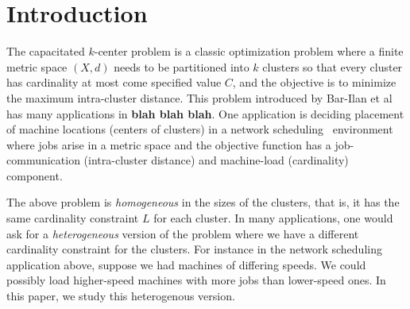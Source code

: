 \section{Introduction}
The capacitated $k$-center problem is a classic optimization problem where a finite metric space $(X,d)$ needs to be partitioned into $k$ clusters so that  every  cluster has cardinality at most
come specified value $C$, and the objective is to minimize the maximum intra-cluster distance. This problem introduced by Bar-Ilan et al~\cite{BKP93} has many applications in {\bf blah blah blah}.
One application is deciding placement of machine locations (centers of clusters) in a network scheduling~\cite{Stein} environment where jobs arise in a metric space and the objective function has a  job-communication (intra-cluster distance) and machine-load (cardinality) 
component. 

The above problem is {\em homogeneous} in the sizes of the clusters, that is, it has the same cardinality constraint $L$ for each cluster. In many applications, one would ask for a \emph{heterogeneous} version of the problem where we have a different cardinality constraint for the clusters.
For instance in the network scheduling application above, suppose we had machines of differing speeds. We could possibly load higher-speed machines with more jobs than lower-speed ones. In this paper, we study  this heterogenous version.

